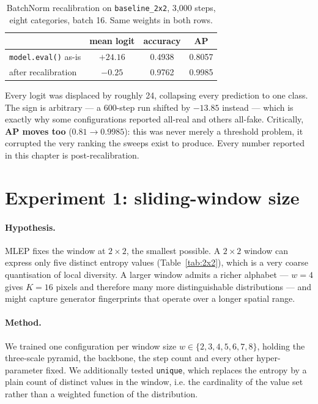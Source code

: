 \begin{table}[h]
  \centering
  \caption{BatchNorm recalibration on \texttt{baseline\_2x2}, 3{,}000 steps,
  eight categories, batch 16. Same weights in both rows.}
  \label{tab:bn}
  \begin{tabular}{lccc}
    \toprule
     & mean logit & accuracy & AP \\
    \midrule
    \texttt{model.eval()} as-is & $+24.16$ & 0.4938 & 0.8057 \\
    after recalibration          & $-0.25$  & 0.9762 & 0.9985 \\
    \bottomrule
  \end{tabular}
\end{table}

Every logit was displaced by roughly 24, collapsing every prediction to one
class. The sign is arbitrary --- a 600-step run shifted by $-13.85$ instead ---
which is exactly why some configurations reported all-real and others all-fake.
Critically, \textbf{AP moves too} ($0.81 \to 0.9985$): this was never merely a
threshold problem, it corrupted the very ranking the sweeps exist to produce.
Every number reported in this chapter is post-recalibration.

\section{Experiment 1: sliding-window size}
\label{sec:exp-window}

\paragraph{Hypothesis.} MLEP fixes the window at $2\times2$, the smallest
possible. A $2\times2$ window can express only five distinct entropy values
(Table~\ref{tab:2x2}), which is a very coarse quantisation of local diversity.
A larger window admits a richer alphabet --- $w=4$ gives $K=16$ pixels and
therefore many more distinguishable distributions --- and might capture
generator fingerprints that operate over a longer spatial range.

\paragraph{Method.} We trained one configuration per window size
$w \in \{2,3,4,5,6,7,8\}$, holding the three-scale pyramid, the backbone, the
step count and every other hyper-parameter fixed. We additionally tested
\texttt{unique}, which replaces the entropy by a plain count of distinct values
in the window, i.e. the cardinality of the value set rather than a weighted
function of the distribution.

